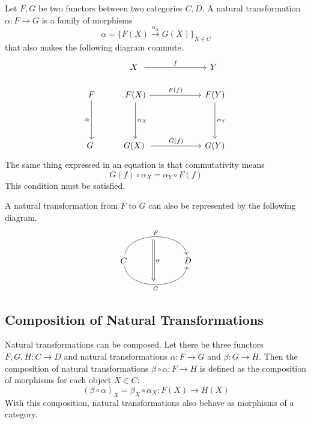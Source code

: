 \documentclass[uplatex,a4j,12pt,dvipdfmx]{jsarticle}
\begin{document}
Let $F, G$ be two functors between two categories $C, D$.
A natural transformation $\alpha : F \to G$ is a family of morphisms
$$\alpha = \Big\{ F(X) \xrightarrow{\alpha_{X}}G(X) \Big\}_{X \in C}$$
that also makes the following diagram commute.
\[
	\begin{tikzcd}
		& X \arrow[rr, "f"]                                &  & Y                             \\
		F \arrow[dd, "\alpha"'] & F(X) \arrow[rr, "F(f)"] \arrow[dd, "\alpha_{X}"] &  & F(Y) \arrow[dd, "\alpha_{Y}"] \\
		&                                                  &  &                               \\
		G                       & G(X) \arrow[rr, "G(f)"]                          &  & G(Y)
	\end{tikzcd}
\]
The same thing expressed in an equation is that commutativity means
$$
	G(f) \circ \alpha_{X} = \alpha_{Y} \circ F(f)
$$
This condition must be satisfied.

A natural transformation from $F$ to $G$ can also be represented by the following diagram.
\[
	\begin{tikzcd}
		& {} \arrow[dd, "\alpha", Rightarrow, shift right] &   \\
		C \arrow[rr, "F", bend left=80] \arrow[rr, "G"', bend right=80] &                                                  & D \\
		& {}                                               &
	\end{tikzcd}
\]

\subsection{Composition of Natural Transformations}
Natural transformations can be composed.
Let there be three functors $F, G, H: C \to D$ and natural transformations $\alpha: F \to G$ and $\beta: G \to H$.
Then the composition of natural transformations $\beta \circ \alpha: F \to H$ is defined as the composition of morphisms for each object $X \in C$:
$$
	(\beta \circ \alpha)_X = \beta_X \circ \alpha_X: F(X) \to H(X)
$$
With this composition, natural transformations also behave as morphisms of a category.
\end{document}
